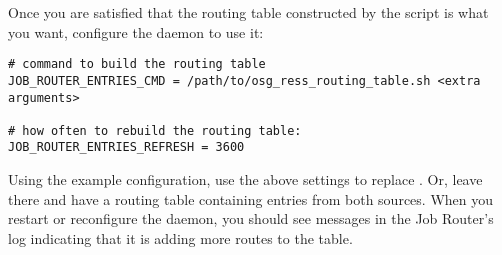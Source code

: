 Once you are satisfied that the routing table constructed by the
script is what you want, configure the  daemon to use it:

\footnotesize
\begin{verbatim}
# command to build the routing table
JOB_ROUTER_ENTRIES_CMD = /path/to/osg_ress_routing_table.sh <extra arguments>

# how often to rebuild the routing table:
JOB_ROUTER_ENTRIES_REFRESH = 3600
\end{verbatim}
\normalsize

Using the example configuration, use the
above settings to replace .  Or,
leave  there and have a routing table
containing entries from both sources.  When you restart or reconfigure
the  daemon,
you should see messages in the Job Router's log indicating that it
is adding more routes to the table.
